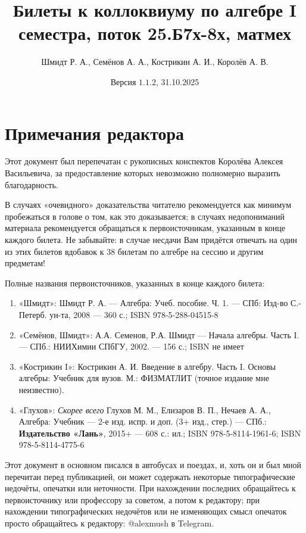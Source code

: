 \documentclass{article}
\title{Билеты к коллоквиуму по алгебре I семестра, поток 25.Б7х-8х, матмех}
\author{Шмидт Р. А., Семёнов А. А., Кострикин А. И., Королёв А. В.}
\date{Версия $\mathbf{1.1.2}$, 31.10.2025}
\begin{document}
\maketitle

\tableofcontents

\sloppy



\newpage
\section*{Примечания редактора}
Этот документ был перепечатан с рукописных конспектов Королёва Алексея Васильевича, за предоставление которых невозможно полномерно выразить благодарность.

В случаях «очевидного» доказательства читателю рекомендуется как минимум пробежаться в голове о том, как это доказывается; в случаях недопониманий материала рекомендуется обращаться к первоисточникам, указанным в конце каждого билета. Не забывайте: в случае несдачи Вам придётся отвечать на один из этих билетов вдобавок к 38 билетам по алгебре на сессию и другим предметам!

Полные названия первоисточников, указанных в конце каждого билета:
\begin{enumerate}
\item «Шмидт»: Шмидт Р. А. --- Алгебра: Учеб. пособие. Ч. 1. --- СПб: Изд-во С.-Петерб. ун-та, 2008 --- 360 с.; ISBN 978-5-288-04515-8
\item «Семёнов, Шмидт»: А.А. Семенов, Р.А. Шмидт --- Начала алгебры. Часть I. --- СПб.: НИИХимии СПбГУ, 2002. --- 156 с.; ISBN не имеет
\item «Кострикин I»: Кострикин А. И. Введение в алгебру. Часть I. Основы алгебры: Учебник для вузов. М.: ФИЗМАТЛИТ (точное издание мне неизвестно).
\item «Глухов»: \textit{Скорее всего} Глухов М. М., Елизаров В. П., Нечаев А. А., Алгебра: Учебник --- 2-е изд. испр. и доп. (3+ изд., стер.) --- СПб.: \textbf{Издательство «Лань»}, 2015+ --- 608 с.: ил.; ISBN 978-5-8114-1961-6; ISBN 978-5-8114-4775-6
\end{enumerate}

Этот документ в основном писался в автобусах и поездах, и, хоть он и был мной перечитан перед публикацией, он может содержать некоторые типографические недочёты, опечатки или неточности. При нахождении последних обращайтесь к первоисточнику или профессору за советом, а потом к редактору; при нахождении типографических недочётов или не изменяющих смысл опечаток просто обращайтесь к редактору: @alexmush в Telegram.
\end{document}
